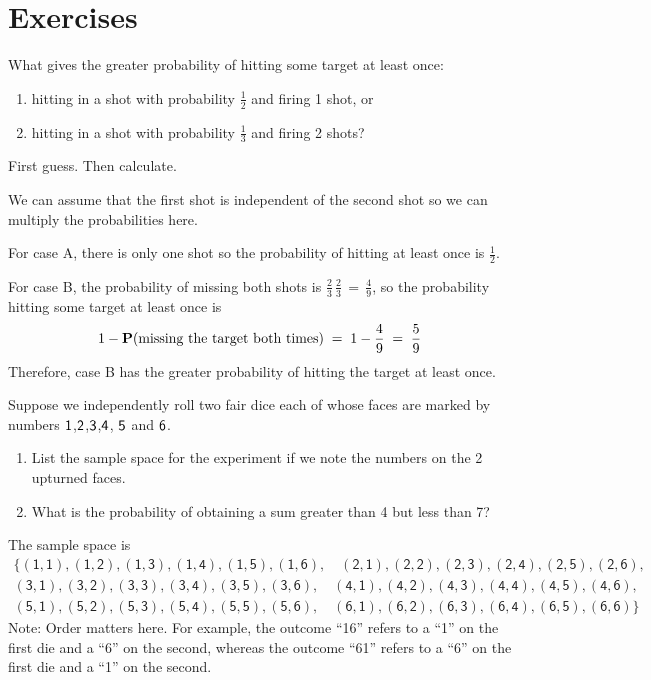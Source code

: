 \section*{Exercises}

\begin{ExerciseList}

\Exercise
What gives the greater probability of hitting some target at least
  once: 
\begin{enumerate}
\item  hitting in a shot with probability $\frac{1}{2}$ and firing 1 shot, or 
\item hitting in a shot with probability $\frac{1}{3}$ and firing 2 shots?
\end{enumerate}
First guess. Then calculate.

\Answer
We can assume  that the first shot is independent of
the second shot so we can multiply the probabilities here.

For case A, there is only one shot so the probability of hitting at least once is $\frac{1}{2}$.

For case B, the probability of missing both shots is
$\frac{2}{3}\,\frac{2}{3}\,=\,\frac{4}{9}$,  so  the probability hitting some target at least once is
  \[ 1- \mathbf{P}(\text{missing the target both times})\;=\; 1-\frac{4}{9}\;=\;\frac{5}{9}\]
Therefore, case B has the greater probability of hitting the target at least once.

\Exercise
Suppose we independently roll two fair dice each of whose faces are marked by numbers
  $\sf 1$,$\sf 2$,$\sf 3$,$\sf 4$, $\sf 5$ and $\sf 6$.
\begin{enumerate}
\item List the sample space for the experiment if we note the   numbers
  on the 2 upturned faces.
\item What is the probability of obtaining a sum greater than 4 but less
  than 7?
\end{enumerate}

\Answer
\be
\item The sample space is
$$
\begin{aligned}
\{
\mathsf{(1,1),(1,2),(1,3),(1,4),(1,5),(1,6),\quad (2,1),(2,2),(2,3),(2,4),(2,5),(2,6),}\\
\mathsf{(3,1),(3,2),(3,3),(3,4),(3,5),(3,6),\quad (4,1),(4,2),(4,3),(4,4),(4,5),(4,6),}\\
\mathsf{(5,1),(5,2),(5,3),(5,4),(5,5),(5,6),\quad (6,1),(6,2),(6,3),(6,4),(6,5),(6,6)}
\}
\end{aligned}
$$
Note: Order matters here. For example, the outcome ``16'' refers to a ``1'' on the first die and a ``6'' on the second,
whereas the outcome ``61'' refers to a ``6'' on the first die and a ``1'' on the
second.


\end{ExerciseList}
